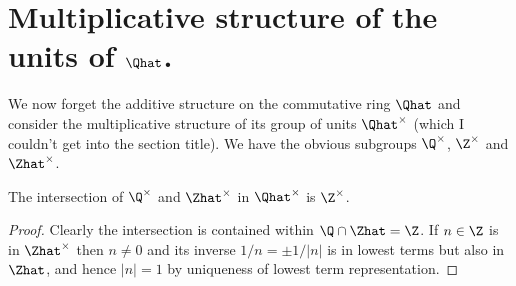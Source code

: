 \section{Multiplicative structure of the units of \texorpdfstring{$\Qhat$}{Qhat}.}

We now forget the additive structure on the commutative ring $\Qhat$ and consider
the multiplicative structure of its group of units $\Qhat^\times$ (which I couldn't
get into the section title). We have the obvious
subgroups $\Q^\times$, $\Z^\times$ and $\Zhat^\times$.

\begin{lemma}
    \label{Qhat.unitsrat_meet_unitszHat}
    \leanok
    The intersection of $\Q^\times$ and $\Zhat^\times$ in $\Qhat^\times$ is $\Z^\times$.
\end{lemma}
\begin{proof}
    \leanok
    Clearly the intersection is contained within $\Q\cap\Zhat=\Z$. If $n\in\Z$ is in $\Zhat^\times$
    then $n\not=0$ and its inverse $1/n=\pm1/|n|$ is in lowest terms but also in $\Zhat$,
    and hence $|n|=1$ by uniqueness of lowest term representation.
\end{proof}

